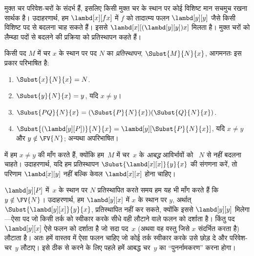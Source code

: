 \documentclass[../../../include/open-logic-section]{subfiles}
\begin{document}

\begin{explain}
मुक्त चर परिवेश-चरों के संदर्भ हैं, इसलिए किसी मुक्त चर के स्थान पर कोई
विशिष्ट मान सचमुच रखना सार्थक है। उदाहरणार्थ, हम $\lambd[x][f x]$ में $f$
को तादात्म्य फलन $\lambd[y][y]$ जैसे किसी विशिष्ट पद से बदलना चाह सकते
हैं। इससे $\lambd[x][(\lambd[y][y]) x]$ मिलता है। मुक्त चरों को लैम्ब्डा
पदों से बदलने की प्रक्रिया को प्रतिस्थापन कहते हैं।
\end{explain}

\begin{defn}[प्रतिस्थापन] 
  किसी पद $M$ में चर $x$ के स्थान पर पद $N$ का \emph{प्रतिस्थापन},
  $\Subst{M}{N}{x}$, आगमनतः इस प्रकार परिभाषित है:
  \begin{enumerate}
    \item $\Subst{x}{N}{x} = N$.  
    \item $\Subst{y}{N}{x}  = y$, यदि $x \neq y$। 
    \item $\Subst{PQ}{N}{x}  = (\Subst{P}{N}{x}) (\Subst{Q}{N}{x})$.
    \item $\Subst{(\lambd[y][P])}{N}{x} = \lambd[y][\Subst{P}{N}{x}]$,
      यदि $x \neq y$ और $y \notin \FV{N}$; अन्यथा अपरिभाषित।
  \end{enumerate}
\end{defn}

\begin{explain}
 में हम $x \neq y$
की माँग करते हैं, क्योंकि हम~$M$ में चर~$x$ के \emph{आबद्ध} आविर्भावों को
~$N$ से नहीं बदलना चाहते। उदाहरणार्थ, यदि हम प्रतिस्थापन
$\Subst{\lambd[x][x]}{y}{x}$ की संगणना करें, तो परिणाम
$\lambd[x][y]$ नहीं बल्कि केवल $\lambd[x][x]$ होना चाहिए।

$\lambd[y][P]$ में~$x$ के स्थान पर $N$ प्रतिस्थापित करते समय हम यह भी माँग
करते हैं कि $y \notin \FV{N}$। उदाहरणार्थ, हम $\lambd[y][x]$ में $x$ के
स्थान पर $y$, अर्थात् $\Subst{\lambd[y][x]}{y}{x}$, प्रतिस्थापित नहीं कर
सकते, क्योंकि इससे $\lambd[y][y]$ मिलेगा---ऐसा पद जो किसी तर्क को स्वीकार
करके सीधे वही लौटाने वाले फलन को दर्शाता है। किंतु पद $\lambd[y][x]$ ऐसे
फलन को दर्शाता है जो सदा पद~$x$ (अथवा वह वस्तु जिसे $x$ संदर्भित करता है)
लौटाता है। अतः हमें वास्तव में ऐसा फलन चाहिए जो कोई तर्क स्वीकार करके उसे
छोड़ दे और परिवेश-चर~$y$ लौटाए। इसे ठीक से करने के लिए पहले हमें आबद्ध
चर~$y$ का ``पुनर्नामकरण'' करना होगा।
\end{explain}
\end{document}

